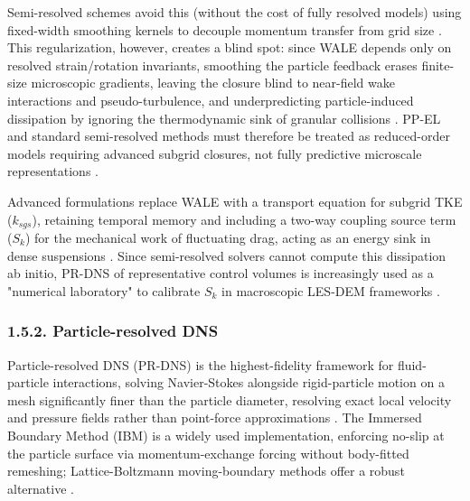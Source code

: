 Semi-resolved schemes avoid this (without the cost of fully resolved models) using fixed-width smoothing kernels to decouple momentum transfer from grid size \cite{che__2024,PEND_Deb2013}. This regularization, however, creates a blind spot: since WALE depends only on resolved strain/rotation invariants, smoothing the particle feedback erases finite-size microscopic gradients, leaving the closure blind to near-field wake interactions and pseudo-turbulence, and underpredicting particle-induced dissipation by ignoring the thermodynamic sink of granular collisions \cite{PEND_Crowe2012,PEND_Finn2016,moore__2019,vreman__2015}. PP-EL and standard semi-resolved methods must therefore be treated as reduced-order models requiring advanced subgrid closures, not fully predictive microscale representations \cite{messa__2021,PEND_Rupp2023}.

Advanced formulations replace WALE with a transport equation for subgrid TKE (\(k_{sgs}\)), retaining temporal memory and including a two-way coupling source term (\(S_{k}\)) for the mechanical work of fluctuating drag, acting as an energy sink in dense suspensions \cite{balachandar__2010,capecelatro__2018}. Since semi-resolved solvers cannot compute this dissipation ab initio, PR-DNS of representative control volumes is increasingly used as a "numerical laboratory" to calibrate \(S_{k}\) in macroscopic LES-DEM frameworks \cite{chouippe__2023,PEND_Finn2016,tenneti__2011}.

\subsubsection{1.5.2. Particle-resolved DNS}

Particle-resolved DNS (PR-DNS) is the highest-fidelity framework for fluid-particle interactions, solving Navier-Stokes alongside rigid-particle motion on a mesh significantly finer than the particle diameter, resolving exact local velocity and pressure fields rather than point-force approximations \cite{balachandar__2010,chouippe__2023,messa__2021}. The Immersed Boundary Method (IBM) is a widely used implementation, enforcing no-slip at the particle surface via momentum-exchange forcing without body-fitted remeshing; Lattice-Boltzmann moving-boundary methods offer a robust alternative \cite{PEND_Crowe2012,PEND_Jin2016,PEND_Shao2012}.

